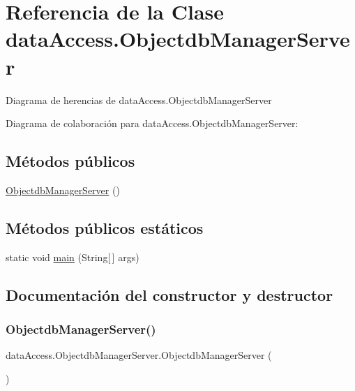 \hypertarget{classdata_access_1_1_objectdb_manager_server}{}\section{Referencia de la Clase data\+Access.\+Objectdb\+Manager\+Server}
\label{classdata_access_1_1_objectdb_manager_server}


Diagrama de herencias de data\+Access.\+Objectdb\+Manager\+Server


Diagrama de colaboración para data\+Access.\+Objectdb\+Manager\+Server\+:
\subsection*{Métodos públicos}
\begin{DoxyCompactItemize}
\item 
\mbox{\hyperlink{classdata_access_1_1_objectdb_manager_server_a6aac62b0bbbebbb54d3105d5820c0061}{Objectdb\+Manager\+Server}} ()
\end{DoxyCompactItemize}
\subsection*{Métodos públicos estáticos}
\begin{DoxyCompactItemize}
\item 
static void \mbox{\hyperlink{classdata_access_1_1_objectdb_manager_server_a2e0f5eddf461be78de905ca56e4295f9}{main}} (String\mbox{[}$\,$\mbox{]} args)
\end{DoxyCompactItemize}


\subsection{Documentación del constructor y destructor}
\mbox{\label{classdata_access_1_1_objectdb_manager_server_a6aac62b0bbbebbb54d3105d5820c0061}} 
\subsubsection{\texorpdfstring{ObjectdbManagerServer()}{ObjectdbManagerServer()}}
{\footnotesize\ttfamily data\+Access.\+Objectdb\+Manager\+Server.\+Objectdb\+Manager\+Server (\begin{DoxyParamCaption}{ }\end{DoxyParamCaption})}

